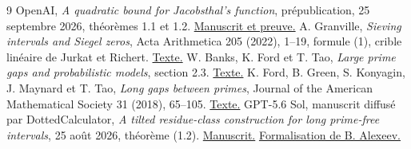 \documentclass[11pt,a4paper]{article}
\begin{document}
\begin{thebibliography}{9}
 OpenAI, \emph{A quadratic bound for Jacobsthal's
function}, prépublication, 25 septembre 2026, théorèmes 1.1 et 1.2.
\href{https://github.com/openai/math/blob/adc7f1241b42e322a6451854ab7e4b4c146bf78a/preprints/A-quadratic-bound-for-Jacobsthals-function-September-25-2026/paper.pdf}{Manuscrit et preuve.}
 A. Granville, \emph{Sieving intervals and Siegel zeros},
Acta Arithmetica 205 (2022), 1--19, formule (1), crible
linéaire de Jurkat et Richert.
\href{https://arxiv.org/abs/2010.01211}{Texte.}
 W. Banks, K. Ford et T. Tao, \emph{Large prime gaps and
probabilistic models}, section 2.3.
\href{https://ford126.web.illinois.edu/wwwpapers/gaps-model.pdf}{Texte.}
 K. Ford, B. Green, S. Konyagin, J. Maynard et T. Tao,
\emph{Long gaps between primes}, Journal of the American Mathematical
Society 31 (2018), 65--105.
\href{https://arxiv.org/abs/1412.5029}{Texte.}
 GPT-5.6 Sol, manuscrit diffusé par DottedCalculator,
\emph{A tilted residue-class construction for long prime-free intervals},
25 août 2026, théorème (1.2).
\href{https://github.com/DottedCalculator/ai-math/blob/main/Erdos_4_GPT_5.6_Sol.pdf}{Manuscrit.}
\href{https://github.com/plby/lean-proofs/blob/main/src/latest/ErdosProblems/Erdos4Tilted.lean}{Formalisation de B. Alexeev.}
\end{thebibliography}
\end{document}
